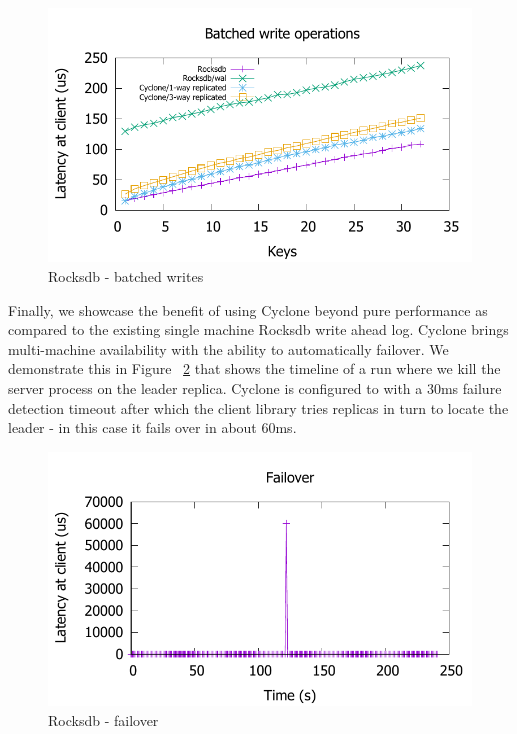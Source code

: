 \documentclass[pageno]{jpaper}
\begin{document}
\begin{figure}
\includegraphics[scale=0.6]{results2/rocksdb_multi.pdf}
\caption{Rocksdb - batched writes}
\label{fig:rocksdb_multi}
\end{figure}

Finally, we showcase the benefit of using Cyclone beyond pure performance as
compared to the existing single machine Rocksdb write ahead log. Cyclone brings
multi-machine availability with the ability to automatically failover. We
demonstrate this in Figure ~\ref{fig:timeline} that shows the timeline of a run
where we kill the server process on the leader replica. Cyclone is configured to
with a 30ms failure detection timeout after which the client library tries
replicas in turn to locate the leader - in this case it fails over in about
60ms.

\begin{figure}
\includegraphics[scale=0.6]{results2/failover.pdf}
\caption{Rocksdb - failover}
\label{fig:timeline}
\end{figure}
\end{document}
